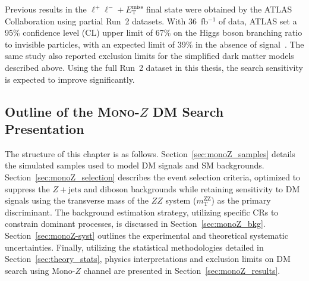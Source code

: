 Previous results in the $\ell^+\ell^- + E_{\text{T}}^{\text{miss}}$ final state were obtained by the ATLAS Collaboration using partial Run~2 datasets. 
With 36~fb$^{-1}$ of data, ATLAS set a 95\% confidence level (CL) upper limit of 67\% on the Higgs boson branching ratio to invisible particles, with an expected limit of 39\% in the absence of signal~\cite{ZHinv-36ifb}. 
The same study also reported exclusion limits for the simplified dark matter models described above. Using the full Run~2 dataset in this thesis, the search sensitivity is expected to improve significantly.




%

\subsection{Outline of the \textsc{Mono-}$Z$ DM Search Presentation}

The structure of this chapter is as follows. 
Section~\ref{sec:monoZ_samples} details the simulated samples used to model DM signals and SM backgrounds. 
Section~\ref{sec:monoZ_selection} describes the event selection criteria, optimized to suppress the $Z+\text{jets}$ and diboson backgrounds while retaining sensitivity to DM signals using the transverse mass of the $ZZ$ system ($m_{\text{T}}^{\text{ZZ}}$) as the primary discriminant. The background estimation strategy, utilizing specific CRs to constrain dominant processes, is discussed in Section~\ref{sec:monoZ_bkg}. Section~\ref{sec:monoZ-syst} outlines the experimental and theoretical systematic uncertainties. 
Finally, utilizing the statistical methodologies detailed in Section~\ref{sec:theory_stats}, physics interpretations and exclusion limits on DM search using Mono-$Z$ channel are presented in Section~\ref{sec:monoZ_results}.




